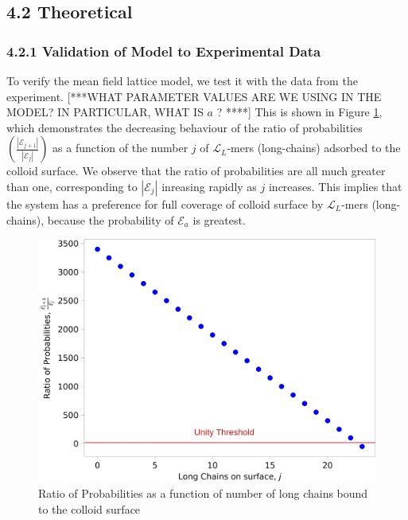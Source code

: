 \documentclass[journal=mamobx,manuscript=article]{achemso}
\newcommand{\leng}{\mathcal{L}}
\begin{document}
\subsection{4.2 Theoretical}

\subsubsection{4.2.1 Validation of Model to Experimental Data}

To verify the mean field lattice model, we test it with the data from the experiment. [***WHAT PARAMETER VALUES ARE WE USING
IN THE MODEL?  IN PARTICULAR, WHAT IS $a$ ? ****]
This is shown in Figure \ref{figure 11}, which demonstrates the decreasing behaviour of the ratio of probabilities 
$\left(\frac{|\mathcal{E}_{j+1}|}{|\mathcal{E}_j|}\right)$ as a function of the number $j$ of $\leng_L$-mers (long-chains) adsorbed to the colloid surface. We observe that the ratio of probabilities %
are all much
greater than one, corresponding to $|\mathcal{E}_j|$ 
inreasing rapidly as $j$ increases.
This implies that the system has a preference for full coverage of colloid surface by $\leng_L$-mers (long-chains), because the probability of $\mathcal{E}_a$ is greatest.


\begin{figure}[H]
\includegraphics[scale=0.10]{Figure_1.jpg}
\caption{Ratio of Probabilities as a function of number of long chains bound to the colloid surface}
\label{figure 11}
\end{figure}
\end{document}
